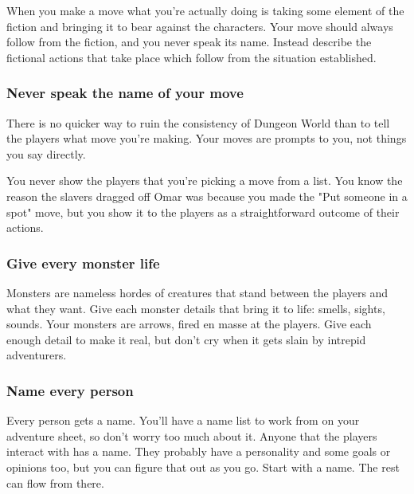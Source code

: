 When you make a move what you're actually doing is taking some element of the fiction and bringing it to bear against the characters. Your move should always follow from the fiction, and you never speak its name. Instead describe the fictional actions that take place which follow from the situation established.

 
\subsubsection{Never speak the name of your move}    
 

There is no quicker way to ruin the consistency of Dungeon World than to tell the players what move you're making. Your moves are prompts to you, not things you say directly.

 

You never show the players that you're picking a move from a list. You know the reason the slavers dragged off Omar was because you made the "Put someone in a spot" move, but you show it to the players as a straightforward outcome of their actions.

 
\subsubsection{Give every monster life}     
 

Monsters are nameless hordes of creatures that stand between the players and what they want. Give each monster details that bring it to life: smells, sights, sounds. Your monsters are arrows, fired en masse at the players. Give each enough detail to make it real, but don't cry when it gets slain by intrepid adventurers.

 
\subsubsection{Name every person}   
 

Every person gets a name. You'll have a name list to work from on your adventure sheet, so don't worry too much about it. Anyone that the players interact with has a name. They probably have a personality and some goals or opinions too, but you can figure that out as you go. Start with a name. The rest can flow from there.

 

